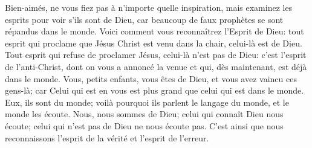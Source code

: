 Bien-aimés, ne vous fiez pas à n’importe quelle inspiration,
	mais examinez les esprits pour voir s’ils sont de Dieu,
	car beaucoup de faux prophètes se sont répandus dans le monde.
Voici comment vous reconnaîtrez l’Esprit de Dieu:
	tout esprit qui proclame que Jésus Christ est venu dans la chair,
	celui-là est de Dieu.
Tout esprit qui refuse de proclamer Jésus, celui-là n’est pas de Dieu:
	c’est l’esprit de l’anti-Christ, dont on vous a annoncé la venue
	et qui, dès maintenant, est déjà dans le monde.
Vous, petits enfants, vous êtes de Dieu, et vous avez vaincu ces gens-là;
	car Celui qui est en vous est plus grand que celui qui est dans le monde.
Eux, ils sont du monde;
	voilà pourquoi ils parlent le langage du monde, et le monde les écoute.
Nous, nous sommes de Dieu;
	celui qui connaît Dieu nous écoute;
	celui qui n’est pas de Dieu ne nous écoute pas.
C’est ainsi que nous reconnaissons l’esprit de la vérité et l’esprit de l’erreur.
